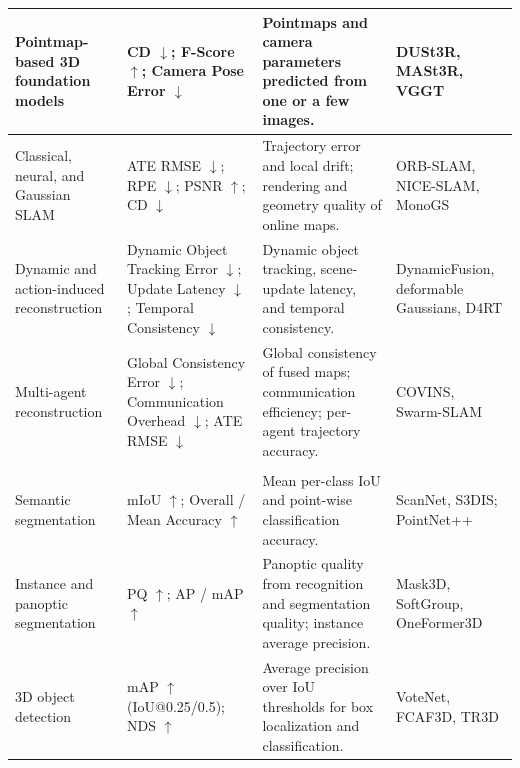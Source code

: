 \documentclass{SCIS2026}
\begin{document}
\begin{table}[!t]
{\begin{tabular}{@{} >{\RaggedRight\arraybackslash}m{2.4cm} >{\RaggedRight\arraybackslash}m{4.6cm} >{\RaggedRight\arraybackslash}m{8.2cm} >{\RaggedRight\arraybackslash}m{3.2cm} @{}}
        \cmidrule[0.25pt](lr){1-4}
        Pointmap-based 3D foundation models & CD $\downarrow$; F-Score $\uparrow$; Camera Pose Error $\downarrow$ & Pointmaps and camera parameters predicted from one or a few images. & DUSt3R, MASt3R, VGGT \\

        \cmidrule[0.25pt](lr){1-4}
        Classical, neural, and Gaussian SLAM & ATE RMSE $\downarrow$; RPE $\downarrow$; PSNR $\uparrow$; CD $\downarrow$ & Trajectory error and local drift; rendering and geometry quality of online maps. & ORB-SLAM, NICE-SLAM, MonoGS \\

        \cmidrule[0.25pt](lr){1-4}
        Dynamic and action-induced reconstruction & Dynamic Object Tracking Error $\downarrow$; Update Latency $\downarrow$; Temporal Consistency $\downarrow$ & Dynamic object tracking, scene-update latency, and temporal consistency. & DynamicFusion, deformable Gaussians, D4RT \\

        \cmidrule[0.25pt](lr){1-4}
        Multi-agent reconstruction & Global Consistency Error $\downarrow$; Communication Overhead $\downarrow$; ATE RMSE $\downarrow$ & Global consistency of fused maps; communication efficiency; per-agent trajectory accuracy. & COVINS, Swarm-SLAM \\

        \arrayrulecolor{TableNavy}
        \cmidrule[0.50pt]{1-4}

        \rowcolor{TableSub}
        \multicolumn{4}{@{}l}{\hspace{0.12em}\textcolor{TableNavy}{\bfseries II.\;Semantic understanding}}\\[0.6em]
        \arrayrulecolor{GrayRule}

        Semantic segmentation & mIoU $\uparrow$; Overall / Mean Accuracy $\uparrow$ & Mean per-class IoU and point-wise classification accuracy. & ScanNet, S3DIS; PointNet++ \\

        \cmidrule[0.25pt](lr){1-4}
        Instance and panoptic segmentation & PQ $\uparrow$; AP / mAP $\uparrow$ & Panoptic quality from recognition and segmentation quality; instance average precision. & Mask3D, SoftGroup, OneFormer3D \\

        \cmidrule[0.25pt](lr){1-4}
        3D object detection & mAP $\uparrow$ (IoU@0.25/0.5); NDS $\uparrow$ & Average precision over IoU thresholds for box localization and classification. & VoteNet, FCAF3D, TR3D \\


\end{tabular}}
\end{table}
\end{document}

